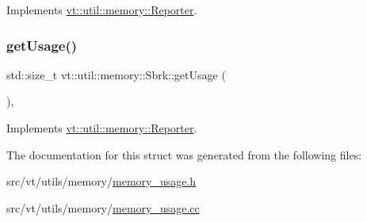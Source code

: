 Implements \hyperlink{structvt_1_1util_1_1memory_1_1_reporter_a83fc36e9cff3ce2deedf1d4546694713}{vt\+::util\+::memory\+::\+Reporter}.

\mbox{\label{structvt_1_1util_1_1memory_1_1_sbrk_af4df47e41f60e7f2da7a6b47c8b4a046}} 
\subsubsection{\texorpdfstring{get\+Usage()}{getUsage()}}
{\footnotesize\ttfamily std\+::size\+\_\+t vt\+::util\+::memory\+::\+Sbrk\+::get\+Usage (\begin{DoxyParamCaption}{ }\end{DoxyParamCaption})\hspace{0.3cm}{\ttfamily [override]}, {\ttfamily [virtual]}}



Implements \hyperlink{structvt_1_1util_1_1memory_1_1_reporter_a372574f51fdb68077cd3d227ee373de5}{vt\+::util\+::memory\+::\+Reporter}.



The documentation for this struct was generated from the following files\+:\begin{DoxyCompactItemize}
\item 
src/vt/utils/memory/\hyperlink{memory__usage_8h}{memory\+\_\+usage.\+h}\item 
src/vt/utils/memory/\hyperlink{memory__usage_8cc}{memory\+\_\+usage.\+cc}\end{DoxyCompactItemize}

